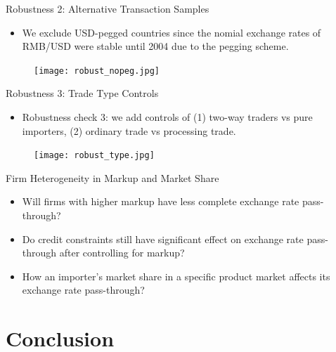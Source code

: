 \documentclass[10pt]{beamer}
\begin{document}
\begin{frame}{Robustness 2: Alternative Transaction Samples}
	\begin{itemize}
		\item We exclude USD-pegged countries since the nomial exchange rates of RMB/USD were stable until 2004 due to the pegging scheme.
	\end{itemize}
	\begin{figure}[htbp]
		\centering
		\texttt{[image: robust\_nopeg.jpg]}
		\label{robust.nopeg}
	\end{figure}
\end{frame}

\begin{frame}{Robustness 3: Trade Type Controls}
	\begin{itemize}
		\item Robustness check 3: we add controls of (1) two-way traders vs pure importers, (2) ordinary trade vs processing trade.
	\end{itemize}
	\begin{figure}[htbp]
		\centering
		\texttt{[image: robust\_type.jpg]}
		\label{robust.type}
	\end{figure}
\end{frame}

\begin{frame}{Firm Heterogeneity in Markup and Market Share}
	\begin{itemize}
		\item Will firms with higher markup have less complete exchange rate pass-through?
		\item Do credit constraints still have significant effect on exchange rate pass-through after controlling for markup?
		\item How an importer's market share in a specific product market affects its exchange rate pass-through?		
	\end{itemize}	
\end{frame}

\section{Conclusion}
\end{document}
